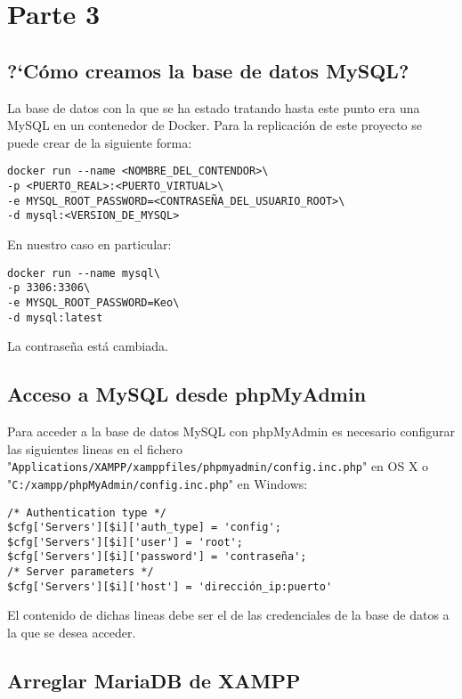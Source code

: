 \documentclass[a4paper, 11pt, oneside]{article} %
\begin{document}
\section{Parte 3}

\subsection{?`Cómo creamos la base de datos MySQL?}

La base de datos con la que se ha estado tratando hasta este punto era una MySQL en un contenedor de Docker. Para la replicación de este proyecto se puede crear de la siguiente forma:

\begin{verbatim}
docker run --name <NOMBRE_DEL_CONTENDOR>\
-p <PUERTO_REAL>:<PUERTO_VIRTUAL>\
-e MYSQL_ROOT_PASSWORD=<CONTRASEÑA_DEL_USUARIO_ROOT>\
-d mysql:<VERSION_DE_MYSQL>
\end{verbatim}

En nuestro caso en particular:

\begin{verbatim}
docker run --name mysql\
-p 3306:3306\
-e MYSQL_ROOT_PASSWORD=Keo\
-d mysql:latest
\end{verbatim}

La contraseña está cambiada.




\subsection{Acceso a MySQL desde phpMyAdmin}

Para acceder a la base de datos MySQL con phpMyAdmin es necesario configurar las siguientes lineas en el fichero "\texttt{Applications/XAMPP/xamppfiles/phpmyadmin/config.inc.php}" en OS X o "\texttt{C:/xampp/phpMyAdmin/config.inc.php}" en Windows:

\begin{verbatim}
/* Authentication type */
$cfg['Servers'][$i]['auth_type] = 'config';
$cfg['Servers'][$i]['user'] = 'root';
$cfg['Servers'][$i]['password'] = 'contraseña';
/* Server parameters */
$cfg['Servers'][$i]['host'] = 'dirección_ip:puerto'
\end{verbatim}

El contenido de dichas lineas debe ser el de las credenciales de la base de datos a la que se desea acceder.




\subsection{Arreglar MariaDB de XAMPP}
\end{document}
